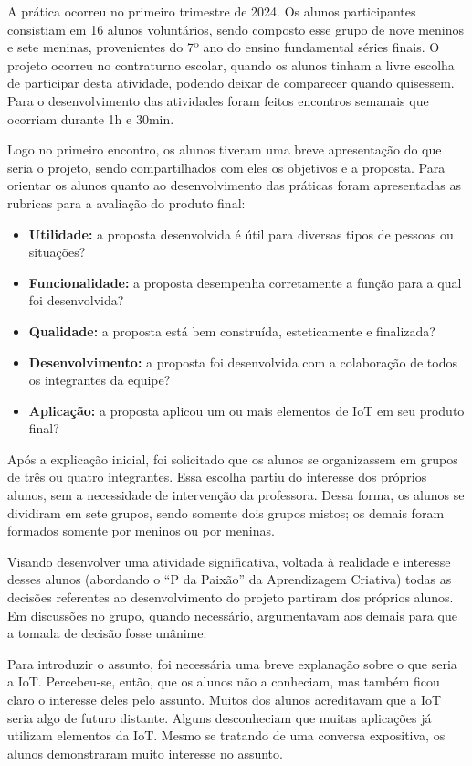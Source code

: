 \documentclass[portuguese]{textolivre}
\begin{document}
A prática ocorreu no primeiro trimestre de 2024. Os alunos participantes consistiam em 16 alunos voluntários, sendo composto esse grupo de nove meninos e sete meninas, provenientes do 7º ano do ensino fundamental séries finais. O projeto ocorreu no contraturno escolar, quando os alunos tinham a livre escolha de participar desta atividade, podendo deixar de comparecer quando quisessem. Para o desenvolvimento das atividades foram feitos encontros semanais que ocorriam durante 1h e 30min.

Logo no primeiro encontro, os alunos tiveram uma breve apresentação do que seria o projeto, sendo compartilhados com eles os objetivos e a proposta. Para orientar os alunos quanto ao desenvolvimento das práticas foram apresentadas  as rubricas para a avaliação do produto final:

\begin{itemize}
\item \textbf{Utilidade:} a proposta desenvolvida é útil para diversas tipos de pessoas ou situações?
\item \textbf{Funcionalidade:} a proposta desempenha corretamente a função para a qual foi desenvolvida?
\item \textbf{Qualidade:} a proposta está bem construída, esteticamente e finalizada? 
\item \textbf{Desenvolvimento:} a proposta foi desenvolvida com a colaboração de todos os integrantes da equipe?
\item \textbf{Aplicação:} a proposta aplicou um ou mais elementos de IoT em seu produto final?
\end{itemize}

Após a explicação inicial, foi solicitado que os alunos se organizassem em grupos de três ou quatro integrantes. Essa escolha partiu do interesse dos próprios alunos, sem a necessidade de intervenção da professora. Dessa forma, os alunos se dividiram em sete grupos, sendo somente dois grupos mistos; os demais foram formados somente por meninos ou por meninas.

Visando desenvolver uma atividade significativa, voltada à realidade e interesse desses alunos (abordando o “P da Paixão” da Aprendizagem Criativa) todas as decisões referentes ao desenvolvimento do projeto partiram dos próprios alunos. Em discussões no grupo, quando necessário, argumentavam aos demais para que a tomada de decisão fosse unânime.

Para introduzir o assunto, foi necessária uma breve explanação sobre o que seria a IoT. Percebeu-se, então, que os alunos não a conheciam, mas também ficou claro o interesse deles pelo assunto. Muitos dos alunos acreditavam que a IoT seria algo de futuro distante. Alguns desconheciam que muitas aplicações já utilizam elementos da IoT. Mesmo se tratando de uma conversa expositiva, os alunos demonstraram muito interesse no assunto.
\end{document}
